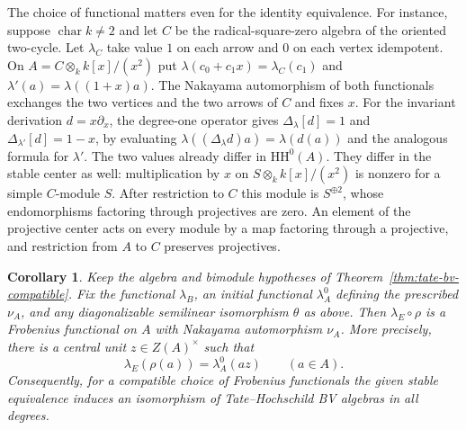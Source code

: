 \documentclass[12pt,a4paper,english,reqno]{amsart}
\numberwithin{equation}{section}
\theoremstyle{plain}
\newtheorem{corollary}[theorem]{Corollary}
\theoremstyle{definition}
\begin{document}
The choice of functional matters even for the identity equivalence.
For instance, suppose $\operatorname{char}k\ne2$ and let $C$ be the
radical-square-zero algebra of the oriented two-cycle.
Let $\lambda_C$ take value $1$ on each arrow and $0$ on each
vertex idempotent. On $A=C\otimes_k k[x]/(x^2)$ put
$\lambda(c_0+c_1x)=\lambda_C(c_1)$ and
$\lambda'(a)=\lambda((1+x)a)$. The Nakayama automorphism of both
functionals exchanges the two vertices and the two arrows of $C$
and fixes $x$. For the invariant derivation $d=x\partial_x$,
the degree-one operator gives $\Delta_\lambda[d]=1$ and
$\Delta_{\lambda'}[d]=1-x$, by evaluating
$\lambda((\Delta_\lambda d)a)=\lambda(d(a))$ and the analogous
formula for $\lambda'$. The two values already differ in
$\mathrm{HH}^0(A)$. They differ in the stable center as well:
multiplication by $x$ on $S\otimes_k k[x]/(x^2)$ is nonzero for
a simple $C$-module $S$. After restriction to $C$ this module is
$S^{\oplus2}$, whose endomorphisms factoring through projectives
are zero. An element of the projective center acts on every
module by a map factoring through a projective, and restriction
from $A$ to $C$ preserves projectives.

\begin{corollary}
\label{cor:tate-bv-normalization}
Keep the algebra and bimodule hypotheses of
Theorem~\ref{thm:tate-bv-compatible}. Fix the functional
$\lambda_B$, an initial functional $\lambda_A^0$ defining the
prescribed $\nu_A$, and any diagonalizable semilinear
isomorphism $\theta$ as above. Then $\lambda_E\circ\rho$ is a
Frobenius functional on $A$ with Nakayama automorphism $\nu_A$.
More precisely, there is a central unit $z\in Z(A)^\times$ such
that
\[
 \lambda_E(\rho(a))=\lambda_A^0(az)\qquad(a\in A).
\]
Consequently, for a compatible choice of Frobenius
functionals the given stable equivalence induces an isomorphism
of Tate--Hochschild BV algebras in all degrees.
\end{corollary}
\end{document}
